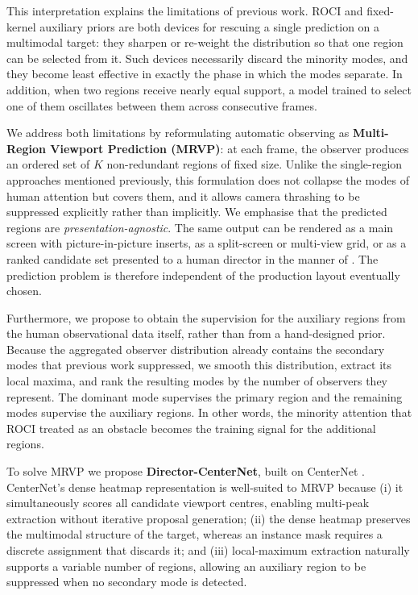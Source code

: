 \documentclass[preprint,12pt]{elsarticle}
\begin{document}
This interpretation explains the limitations of previous work. ROCI
\cite{joo2023learning} and fixed-kernel auxiliary priors
\cite{anonymous2025kbrs} are both devices for rescuing a single prediction on a
multimodal target: they sharpen or re-weight the distribution so that one
region can be selected from it. Such devices necessarily discard the minority
modes, and they become least effective in exactly the phase in
which the modes separate. In addition, when two regions receive nearly equal
support, a model trained to select one of them oscillates between them across
consecutive frames.

We address both limitations by reformulating automatic observing as
\textbf{Multi-Region Viewport Prediction (MRVP)}: at each frame, the observer
produces an ordered set of $K$ non-redundant regions of fixed size. Unlike the
single-region approaches mentioned previously, this formulation does not
collapse the modes of human attention but covers them, and it allows camera
thrashing to be suppressed explicitly rather than implicitly. We emphasise that
the predicted regions are \emph{presentation-agnostic}. The same output can be
rendered as a main screen with picture-in-picture inserts, as a split-screen or
multi-view grid, or as a ranked candidate set presented to a human director in
the manner of \cite{chen2018learning}. The prediction problem is therefore
independent of the production layout eventually chosen.

Furthermore, we propose to obtain the supervision for the auxiliary regions
from the human observational data itself, rather than from a hand-designed
prior. Because the aggregated observer distribution already contains the
secondary modes that previous work suppressed, we smooth this distribution,
extract its local maxima, and rank the resulting modes by the number of
observers they represent. The dominant mode supervises the primary region and
the remaining modes supervise the auxiliary regions. In other words, the
minority attention that ROCI treated as an obstacle becomes the training signal
for the additional regions.

To solve MRVP we propose \textbf{Director-CenterNet}, built on CenterNet 
\cite{zhou2019objects}. CenterNet's dense heatmap representation is 
well-suited to MRVP because (i) it simultaneously scores all candidate 
viewport centres, enabling multi-peak extraction without iterative proposal 
generation; (ii) the dense heatmap preserves the multimodal structure of the
target, whereas an instance mask requires a discrete assignment that discards
it; and (iii) local-maximum extraction naturally supports a variable number of
regions, allowing an auxiliary region to be suppressed when no secondary mode
is detected.
\end{document}
